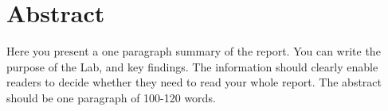\section{Abstract}
\tab Here you present a one paragraph summary of the report. You can write the purpose of the Lab, and key findings. The information should clearly enable readers to decide whether they need to read your whole report. The abstract should be one paragraph of 100-120 words.


